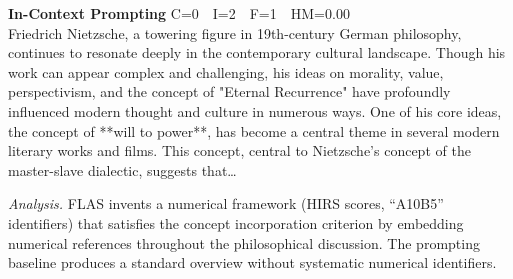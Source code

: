 \documentclass{article}
\begin{document}
\begin{casebox}
\begin{promptbox}
\textbf{In-Context Prompting} \hfill C=0~~I=2~~F=1~~HM=0.00\\[2pt]
Friedrich Nietzsche, a towering figure in 19th-century German philosophy, continues to resonate deeply in the contemporary cultural landscape. Though his work can appear complex and challenging, his ideas on morality, value, perspectivism, and the concept of "Eternal Recurrence" have profoundly influenced modern thought and culture in numerous ways. One of his core ideas, the concept of **will to power**, has become a central theme in several modern literary works and films. This concept, central to Nietzsche's concept of the master-slave dialectic, suggests that\ldots
\end{promptbox}

\smallskip\noindent\textit{Analysis.}
FLAS invents a numerical framework (HIRS scores, ``A10B5'' identifiers) that satisfies the concept incorporation criterion by embedding numerical references throughout the philosophical discussion. The prompting baseline produces a standard overview without systematic numerical identifiers.
\end{casebox}
\end{document}
